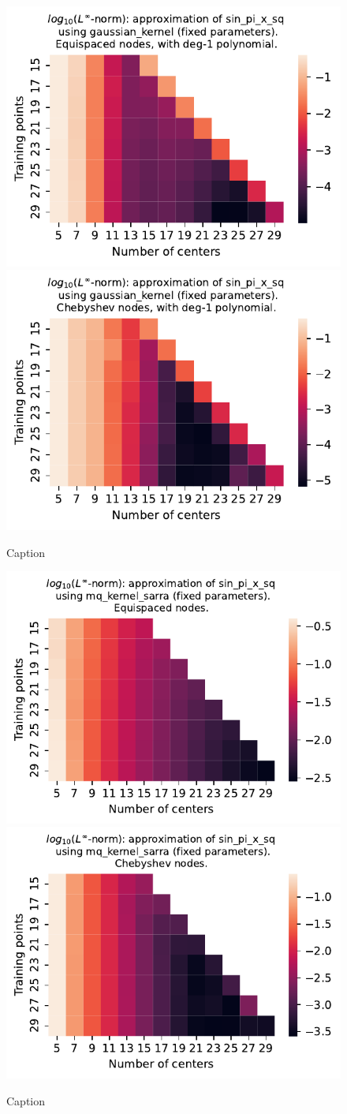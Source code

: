 \documentclass[12pt]{report} %
\begin{document}
\begin{figure}[ht]
  \centering

  \includegraphics[width=.49\textwidth]{imagenes/experiments/1d/least_squares/opt-sin_pi_x_sq-Kgaussian_kernel-Poly-Equi.pdf}
  \includegraphics[width=.49\textwidth]{imagenes/experiments/1d/least_squares/opt-sin_pi_x_sq-Kgaussian_kernel-Poly-Cheb.pdf}
  \caption{Caption}
  \label{fig:opt-sin-pi-x-sq-gaussian-poly}
\end{figure}


\begin{figure}[ht]
  \centering

  \includegraphics[width=.49\textwidth]{imagenes/experiments/1d/least_squares/opt-sin_pi_x_sq-Kmq_kernel_sarra-Equi.pdf}
  \includegraphics[width=.49\textwidth]{imagenes/experiments/1d/least_squares/opt-sin_pi_x_sq-Kmq_kernel_sarra-Cheb.pdf}
  \caption{Caption}
  \label{fig:opt-sin-pi-x-sq-sarra}
\end{figure}
\end{document}
